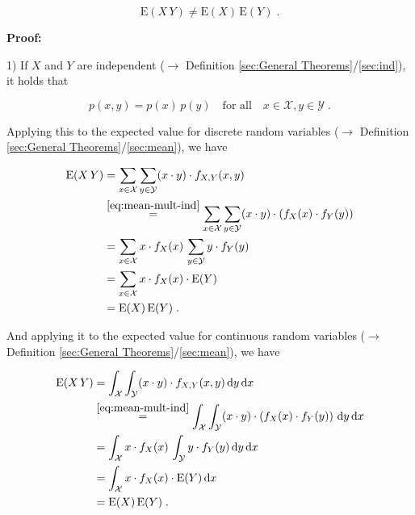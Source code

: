 \documentclass[a4paper,12pt,twoside]{book}
\begin{document}
\begin{equation} \label{eq:mean-mult-mean-nonmult}
\mathrm{E}(X\,Y) \neq \mathrm{E}(X) \, \mathrm{E}(Y) \; .
\end{equation}


\vspace{1em}
\textbf{Proof:}

1) If $X$ and $Y$ are independent ($\rightarrow$ Definition \ref{sec:General Theorems}/\ref{sec:ind}), it holds that

\begin{equation} \label{eq:mean-mult-ind}
p(x,y) = p(x) \, p(y) \quad \text{for all} \quad x \in \mathcal{X}, y \in \mathcal{Y} \; .
\end{equation}

Applying this to the expected value for discrete random variables ($\rightarrow$ Definition \ref{sec:General Theorems}/\ref{sec:mean}), we have

\begin{equation} \label{eq:mean-mult-mean-mult-disc}
\begin{split}
\mathrm{E}(X\,Y) &= \sum_{x \in \mathcal{X}} \sum_{y \in \mathcal{Y}} (x \cdot y) \cdot f_{X,Y}(x,y) \\
&\overset{\eqref{eq:mean-mult-ind}}{=} \sum_{x \in \mathcal{X}} \sum_{y \in \mathcal{Y}} (x \cdot y) \cdot \left( f_X(x) \cdot f_Y(y) \right) \\
&= \sum_{x \in \mathcal{X}} x \cdot f_X(x) \, \sum_{y \in \mathcal{Y}} y \cdot f_Y(y) \\
&= \sum_{x \in \mathcal{X}} x \cdot f_X(x) \cdot \mathrm{E}(Y) \\
&= \mathrm{E}(X) \, \mathrm{E}(Y) \; . \\
\end{split}
\end{equation}

And applying it to the expected value for continuous random variables ($\rightarrow$ Definition \ref{sec:General Theorems}/\ref{sec:mean}), we have

\begin{equation} \label{eq:mean-mult-mean-mult-cont}
\begin{split}
\mathrm{E}(X\,Y) &= \int_{\mathcal{X}} \int_{\mathcal{Y}} (x \cdot y) \cdot f_{X,Y}(x,y) \, \mathrm{d}y \, \mathrm{d}x \\
&\overset{\eqref{eq:mean-mult-ind}}{=} \int_{\mathcal{X}} \int_{\mathcal{Y}} (x \cdot y) \cdot \left( f_X(x) \cdot f_Y(y) \right) \, \mathrm{d}y \, \mathrm{d}x \\
&= \int_{\mathcal{X}} x \cdot f_X(x) \, \int_{\mathcal{Y}} y \cdot f_Y(y)  \, \mathrm{d}y \, \mathrm{d}x \\
&= \int_{\mathcal{X}} x \cdot f_X(x) \cdot \mathrm{E}(Y) \, \mathrm{d}x \\
&= \mathrm{E}(X) \, \mathrm{E}(Y) \; . \\
\end{split}
\end{equation}
\end{document}
